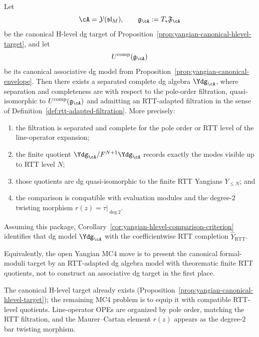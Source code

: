 \begin{conjecture}
\label{conj:dg-shifted-yangian-rtt-package}
Let
\[
\cA=\mathcal{Y}(\mathfrak{sl}_M),
\qquad
\mathfrak{g}_{\cA}:=T_*\mathfrak{F}_{\cA}
\]
be the canonical H-level dg target of
Proposition~\ref{prop:yangian-canonical-hlevel-target}, and let
\[
U^{\mathrm{comp}}(\mathfrak{g}_{\cA})
\]
be its canonical associative dg model from
Proposition~\ref{prop:yangian-canonical-envelope}.  Then there exists a
separated complete dg algebra $\Ydg_{\cA}$, where separation and
completeness are with respect to the pole-order filtration,
quasi-isomorphic to
$U^{\mathrm{comp}}(\mathfrak{g}_{\cA})$ and admitting an RTT-adapted
filtration in the sense of
Definition~\ref{def:rtt-adapted-filtration}.  More precisely:
\begin{enumerate}
\item the filtration is separated and complete for the pole order or
  RTT level of the line-operator expansion;
\item the finite quotient
  $\Ydg_{\cA}/F^{N+1}\Ydg_{\cA}$ records exactly the modes visible up to
  RTT level $N$;
\item those quotients are dg quasi-isomorphic to the finite RTT
  Yangians $Y_{\le N}$; and
\item the comparison is compatible with evaluation modules and the
  degree-$2$ twisting morphism $r(z)=\tau|_{\deg 2}$.
\end{enumerate}
Assuming this package, Corollary~\ref{cor:yangian-hlevel-comparison-criterion}
identifies that dg model $\Ydg_{\cA}$ with the coefficientwise RTT
completion $\widehat Y_{\mathrm{RTT}}$.

Equivalently, the open Yangian MC4 move is to present the canonical
formal-moduli target by an RTT-adapted dg algebra model with theorematic
finite RTT quotients, not to construct an associative dg target in the
first place.
\end{conjecture}

\begin{remark}
\label{rem:dg-shifted-filtration-evidence}
The canonical H-level target already exists (Proposition~\ref{prop:yangian-canonical-hlevel-target}); the remaining MC4 problem is to equip it with compatible RTT-level quotients.  Line-operator OPEs are organized by pole order, matching the RTT filtration, and the Maurer--Cartan element $r(z)$ appears as the degree-$2$ bar twisting morphism.
\end{remark}

